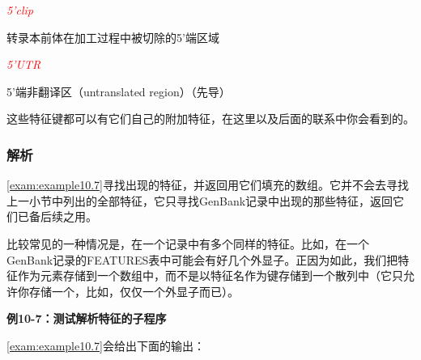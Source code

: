 \textcolor{red}{\textit{5'clip}}
\begin{adjustwidth}{1cm}{}
转录本前体在加工过程中被切除的5'端区域
\end{adjustwidth}

\textcolor{red}{\textit{5'UTR}}
\begin{adjustwidth}{1cm}{}
5'端非翻译区（untranslated region）（先导）
\end{adjustwidth}

这些特征键都可以有它们自己的附加特征，在这里以及后面的联系中你会看到的。

\subsubsection{解析}
\autoref{exam:example10.7}寻找出现的特征，并返回用它们填充的数组。它并不会去寻找上一小节中列出的全部特征，它只寻找GenBank记录中出现的那些特征，返回它们已备后续之用。

比较常见的一种情况是，在一个记录中有多个同样的特征。比如，在一个GenBank记录的FEATURES表中可能会有好几个外显子。正因为如此，我们把特征作为元素存储到一个数组中，而不是以特征名作为键存储到一个散列中（它只允许你存储一个，比如，仅仅一个外显子而已）。

\textbf{例10-7：测试解析特征的子程序}


\autoref{exam:example10.7}会给出下面的输出：

